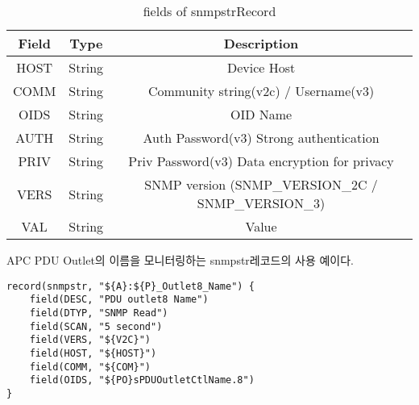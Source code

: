 \documentclass[11pt
  , a4paper
  , article
  , oneside
]{memoir}
\begin{document}
\begin{table}[!h]
\begin{center}
\begin{tabular}{c|c|c}\hline
Field & Type & Description \\ \hline
HOST & String & Device Host \\ \hline
COMM & String & Community string(v2c) / Username(v3) \\ \hline
OIDS & String & OID Name \\ \hline
AUTH & String & Auth Password(v3) Strong authentication \\ \hline
PRIV & String & Priv Password(v3) Data encryption for privacy\\ \hline
VERS & String & SNMP version (SNMP\_VERSION\_2C / SNMP\_VERSION\_3) \\ \hline
VAL & String & Value \\ \hline
\end{tabular}
\caption{fields of snmpstrRecord}
\label{table:snmpstrrecord} 
\end{center}
\end{table} 

APC PDU Outlet의 이름을 모니터링하는 snmpstr레코드의 사용 예이다. 

{\scriptsize
\begin{verbatim}
record(snmpstr, "${A}:${P}_Outlet8_Name") {
    field(DESC, "PDU outlet8 Name")
    field(DTYP, "SNMP Read")
    field(SCAN, "5 second")
    field(VERS, "${V2C}")
    field(HOST, "${HOST}")
    field(COMM, "${COM}")
    field(OIDS, "${PO}sPDUOutletCtlName.8")
}
\end{verbatim}
}



\clearpage


\end{document}
